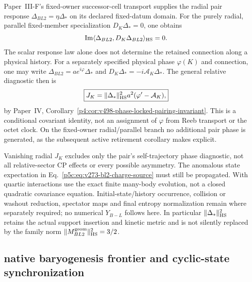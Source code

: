 \documentclass[12pt,a4paper]{article}
\begin{document}
\begin{corollary}
\label{p5c:cor:v273-bl2-relative-phase-target}
Paper~III-F's fixed-owner successor-cell transport supplies the radial pair
response $\Delta_{BL2}=\eta\Delta_*$ on its declared fixed-datum domain.
For the purely radial, parallel fixed-member specialization
$D_K\Delta_*=0$, one obtains
\[
 \operatorname{Im}\langle\Delta_{BL2},D_K\Delta_{BL2}\rangle_{\rm HS}=0.
\]
The scalar response law alone does not determine the retained connection
along a physical history.
For a separately specified physical phase $\varphi(K)$ and connection,
one may write $\Delta_{BL2}=a e^{i\varphi}\Delta_*$ and
$D_K\Delta_*=-i\mathcal A_K\Delta_*$.  The general relative diagnostic then is
\[
 \boxed{J_K=\|\Delta_*\|_{\rm HS}^2a^2
                    (\varphi'-\mathcal A_K),}
\]
by Paper~IV, Corollary~\ref{p4:cor:v498-phase-locked-pairing-invariant}.
This is a conditional covariant identity, not an assignment of $\varphi$
from Reeb transport or the octet clock.  On the fixed-owner radial/parallel
branch no additional pair phase is generated, as the subsequent active
retirement corollary makes explicit.
\end{corollary}

\begin{remark}
\label{p5c:rem:v273-bl2-response-scope}
Vanishing radial $J_K$ excludes only the pair's self-trajectory phase
diagnostic, not all relative-sector CP effects or every possible asymmetry.
The anomalous state expectation in Eq.~\eqref{p5c:eq:v273-bl2-charge-source}
must still be propagated.  With quartic interactions use the exact finite
many-body evolution, not a closed quadratic covariance equation.
Initial-state/history occurrence, collision or washout reduction, spectator
maps and final entropy normalization remain where separately required; no
numerical $Y_{B-L}$ follows here.  In particular
$\|\Delta_*\|_{\rm HS}^2$ retains the actual support insertion and kinetic
metric and is not silently replaced by the family norm
$\|M_{BL2}^{\rm geom}\|_{\rm HS}^2=3/2$.
\end{remark}




\subsection{native baryogenesis frontier and cyclic-state synchronization}
\label{p5c:sec:v280-baryogenesis-cyclic-state-sync}
\end{document}
